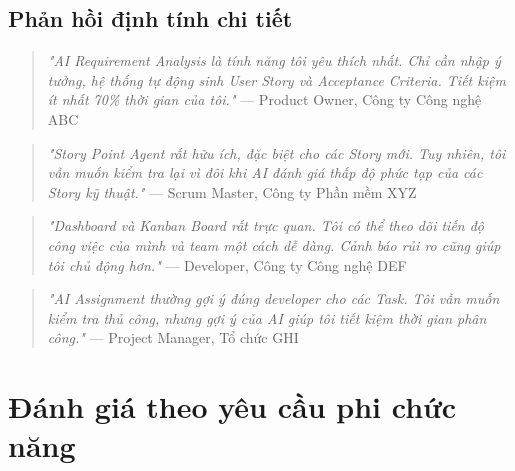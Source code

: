 \documentclass[12pt,a4paper]{report}
\begin{document}
\subsection{Phản hồi định tính chi tiết}

\begin{quote}
\textit{"AI Requirement Analysis là tính năng tôi yêu thích nhất. Chỉ cần nhập ý tưởng, hệ thống tự động sinh User Story và Acceptance Criteria. Tiết kiệm ít nhất 70\% thời gian của tôi."}
— Product Owner, Công ty Công nghệ ABC
\end{quote}

\begin{quote}
\textit{"Story Point Agent rất hữu ích, đặc biệt cho các Story mới. Tuy nhiên, tôi vẫn muốn kiểm tra lại vì đôi khi AI đánh giá thấp độ phức tạp của các Story kỹ thuật."}
— Scrum Master, Công ty Phần mềm XYZ
\end{quote}

\begin{quote}
\textit{"Dashboard và Kanban Board rất trực quan. Tôi có thể theo dõi tiến độ công việc của mình và team một cách dễ dàng. Cảnh báo rủi ro cũng giúp tôi chủ động hơn."}
— Developer, Công ty Công nghệ DEF
\end{quote}

\begin{quote}
\textit{"AI Assignment thường gợi ý đúng developer cho các Task. Tôi vẫn muốn kiểm tra thủ công, nhưng gợi ý của AI giúp tôi tiết kiệm thời gian phân công."}
— Project Manager, Tổ chức GHI
\end{quote}

\section{Đánh giá theo yêu cầu phi chức năng}
\end{document}
